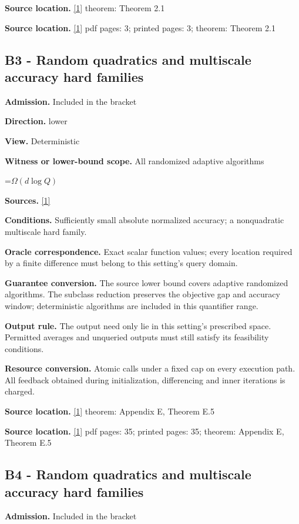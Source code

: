 \documentclass[10pt,a4paper]{article}
\newcommand{\AtlasMath}[1]{\par\begingroup\centering\setbox0=\hbox{$\displaystyle #1$}\ifdim\wd0>1.4\linewidth\typeout{ATLAS WIDE FORMULA: \the\wd0}\fi\ifdim\wd0>\linewidth\resizebox{\linewidth}{!}{\box0}\else\box0\fi\par\endgroup}
\begin{document}
\textbf{Source location.} \href{https://arxiv.org/html/2610.00345v1}{[1]} theorem: Theorem 2.1

\textbf{Source location.} \href{https://arxiv.org/html/2610.00345v1}{[1]} pdf pages: 3; printed pages: 3; theorem: Theorem 2.1

\subsection{B3 - Random quadratics and multiscale accuracy hard families}
\textbf{Admission.} Included in the bracket

\textbf{Direction.} lower

\textbf{View.} Deterministic

\textbf{Witness or lower-bound scope.} All randomized adaptive algorithms

\AtlasMath{\Omega(d\log Q)}
\textbf{Sources.} \href{https://arxiv.org/html/2610.00345v1}{[1]}

\textbf{Conditions.} Sufficiently small absolute normalized accuracy; a nonquadratic multiscale hard family.

\textbf{Oracle correspondence.} Exact scalar function values; every location required by a finite difference must belong to this setting's query domain.

\textbf{Guarantee conversion.} The source lower bound covers adaptive randomized algorithms. The subclass reduction preserves the objective gap and accuracy window; deterministic algorithms are included in this quantifier range.

\textbf{Output rule.} The output need only lie in this setting's prescribed space. Permitted averages and unqueried outputs must still satisfy its feasibility conditions.

\textbf{Resource conversion.} Atomic calls under a fixed cap on every execution path. All feedback obtained during initialization, differencing and inner iterations is charged.

\textbf{Source location.} \href{https://arxiv.org/html/2610.00345v1}{[1]} theorem: Appendix E, Theorem E.5

\textbf{Source location.} \href{https://arxiv.org/html/2610.00345v1}{[1]} pdf pages: 35; printed pages: 35; theorem: Appendix E, Theorem E.5

\subsection{B4 - Random quadratics and multiscale accuracy hard families}
\textbf{Admission.} Included in the bracket
\end{document}
